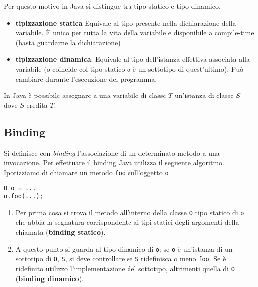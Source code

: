 \documentclass{article}
\begin{document}
Per questo motivo in Java si distingue tra tipo statico e tipo dinamico.
\begin{itemize}
	\item \textbf{tipizzazione statica} Equivale al tipo presente nella dichiarazione della variabile.
	È unico per tutta la vita della variabile e disponibile a compile-time (basta guardarne la dichiarazione)
	\item \textbf{tipizzazione dinamica}: Equivale al tipo dell'istanza effettiva associata alla variabile (o coincide col tipo statico o è un sottotipo di quest'ultimo).
	Può cambiare durante l'esecuzione del programma.
\end{itemize}

In Java è possibile assegnare a una variabile di classe $T$ un'istanza di classe $S$
dove $S$ eredita $T$.






\subsection{Binding}

Si definisce con \emph{binding} l'associazione di un determinato metodo a una invocazione.
Per effettuare il binding Java utilizza il seguente algoritmo.
Ipotizziamo di chiamare un metodo \texttt{foo} sull'oggetto \texttt{o}


\begin{lstlisting}
O o = ...
o.foo(...);
\end{lstlisting}

\begin{enumerate}
	\item Per prima cosa si trova il metodo all'interno della classe \texttt{O} tipo statico di \texttt{o} che abbia la segnatura corrispondente ai tipi statici degli argomenti della chiamata
	(\textbf{binding statico}).
	\item A questo punto si guarda al tipo dinamico di \texttt{o}: se 
	\texttt{o} è un'istanza di un sottotipo di \texttt{O}, \texttt{S}, si deve controllare
	se \texttt{S} ridefinisca o meno \texttt{foo}. Se è ridefinito utilizzo l'implementazione del
	sottotipo, altrimenti quella di \texttt{O} (\textbf{binding dinamico}).
\end{enumerate}
\end{document}
